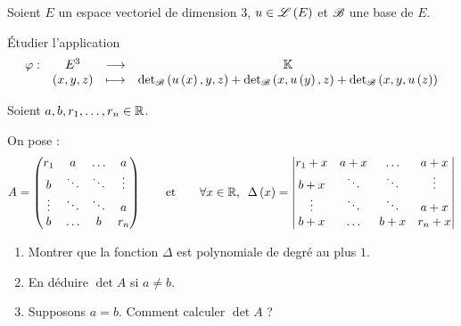 \begin{corr}
\end{corr}

\begin{exo}
Soient \(E\) un espace vectoriel de dimension \(3\), \(u\in\mathscr{L}\left(E\right)\) et \(\mathscr{B}\) une base de \(E\).

Étudier l'application \[\begin{array}[t]{cccc}\varphi : & E^3 & \longrightarrow & \mathbb{K} \\ & \left(x,y,z\right) & \longmapsto & {\det}_{\mathscr{B}}\left(u\left(x\right),y,z\right)+{\det}_{\mathscr{B}}\left(x,u\left(y\right),z\right)+{\det}_{\mathscr{B}}\left(x,y,u\left(z\right)\right)\end{array}\]
\end{exo}

\begin{corr}
\end{corr}

\begin{exo}
Soient \(a,b,r_1,\dots,r_n\in\mathbb{R}\).

On pose : \[A=\begin{pmatrix}
r_1 & a & \dots & a \\
b & \ddots & \ddots & \vdots \\
\vdots & \ddots & \ddots & a \\
b & \dots & b & r_n
\end{pmatrix}\qquad\text{et}\qquad\quantifs{\forall x\in\R}\Delta\paren{x}=\begin{vmatrix}
r_1+x & a+x & \dots & a+x \\
b+x & \ddots & \ddots & \vdots \\
\vdots & \ddots & \ddots & a+x \\
b+x & \dots & b+x & r_n+x
\end{vmatrix}\]

\begin{enumerate}
\item Montrer que la fonction \(\Delta\) est polynomiale de degré au plus \(1\). \\

\item En déduire \(\det A\) si \(a\not=b\). \\

\item Supposons \(a=b\). Comment calculer \(\det A\) ?
\end{enumerate}
\end{exo}

\begin{corr}
\end{corr}